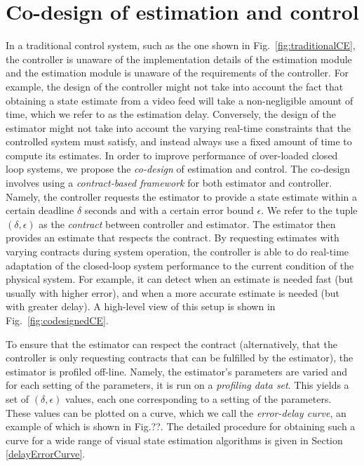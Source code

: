 
\section{Co-design of estimation and control}
\label{sec:codesign}
In a traditional control system, such as the one shown in Fig.~\ref{fig:traditionalCE}, the controller is unaware of the implementation details of the estimation module and the estimation module is unaware of the requirements of the controller. 
For example, the design of the controller might not take into account the fact that obtaining a state estimate from a video feed will take a non-negligible amount of time, which we refer to as the estimation delay.
Conversely, the design of the estimator might not take into account the varying real-time constraints that the controlled system must satisfy, and instead always use a fixed amount of time to compute its estimates.
In order to improve performance of over-loaded closed loop systems, we propose the \emph{co-design} of estimation and control. 
The co-design involves using a \emph{contract-based framework} for both estimator and controller.
Namely, the controller requests the estimator to provide a state estimate within a certain deadline $\delta$ seconds and with a certain error bound $\epsilon$.
We refer to the tuple $(\delta,\epsilon)$ as the \emph{contract} between controller and estimator.
The estimator then provides an estimate that respects the contract.
By requesting estimates with varying contracts during system operation, the controller is able to do real-time adaptation of the closed-loop system performance to the current condition of the physical system.
For example, it can detect when an estimate is needed fast (but usually with higher error), and when a more accurate estimate is needed (but with greater delay).
A high-level view of this setup is shown in Fig.~\ref{fig:codesignedCE}. 

To ensure that the estimator can respect the contract (alternatively, that the controller is only requesting contracts that can be fulfilled by the estimator), the estimator is profiled off-line.
Namely, the estimator's parameters are varied and for each setting of the parameters, it is run on a \emph{profiling data set}. 
This yields a set of $(\delta,\epsilon)$ values, each one corresponding to a setting of the parameters.
These values can be plotted on a curve, which we call the \emph{error-delay curve}, an example of which is shown in Fig.??.
The detailed procedure for obtaining such a curve for a wide range of visual state estimation algorithms is given in Section \ref{delayErrorCurve}.

